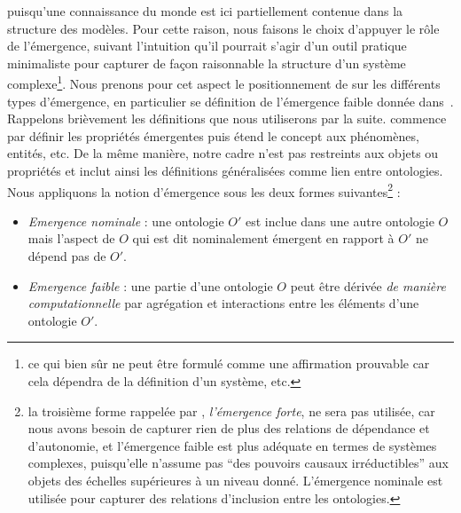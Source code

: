 {puisqu'une connaissance du monde est ici partiellement contenue dans la structure des modèles. 
Pour cette raison, nous faisons le choix d'appuyer le rôle de l'émergence, suivant l'intuition qu'il pourrait s'agir d'un outil pratique minimaliste pour capturer de façon raisonnable la structure d'un système complexe\footnote{ce qui bien sûr ne peut être formulé comme une affirmation prouvable car cela dépendra de la définition d'un système, etc.}. Nous prenons pour cet aspect le positionnement de  sur les différents types d'émergence, en particulier se définition de l'émergence faible donnée dans~\cite{bedau2002downward}. 
 Rappelons brièvement les définitions que nous utiliserons par la suite.  commence par définir les propriétés émergentes puis étend le concept aux phénomènes, entités, etc. De la même manière, notre cadre n'est pas restreints aux objets ou propriétés et inclut ainsi les définitions généralisées comme lien entre ontologies. Nous appliquons la notion d'émergence sous les deux formes suivantes\footnote{la troisième forme rappelée par , \emph{l'émergence forte}, ne sera pas utilisée, car nous avons besoin de capturer rien de plus des relations de dépendance et d'autonomie, et l'émergence faible est plus adéquate en termes de systèmes complexes, puisqu'elle n'assume pas ``des pouvoirs causaux irréductibles'' aux objets des échelles supérieures à un niveau donné. L'émergence nominale est utilisée pour capturer des relations d'inclusion entre les ontologies.} :
\begin{itemize}
\item \emph{Emergence nominale} : une ontologie $O'$ est inclue dans une autre ontologie $O$ mais l'aspect de $O$ qui est dit nominalement émergent en rapport à $O'$ ne dépend pas de $O'$.
\item \emph{Emergence faible} : une partie d'une ontologie $O$ peut être dérivée \emph{de manière computationnelle} par agrégation et interactions entre les éléments d'une ontologie $O'$.
\end{itemize}
}


